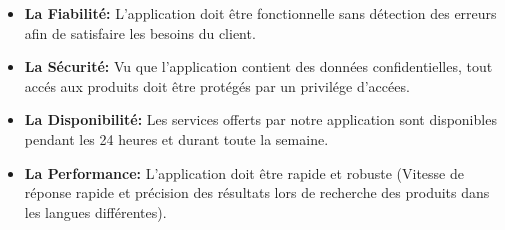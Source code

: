 \begin{itemize}
    \item \small\textbf{La Fiabilité: } L'application doit être fonctionnelle sans détection des erreurs afin de satisfaire les besoins du client.

    \item \small\textbf{La Sécurité: } Vu que l'application contient des données confidentielles, tout accés aux produits doit être protégés par un privilége d'accées.

     \item \small\textbf{La Disponibilité: } Les services offerts par notre application sont disponibles pendant les 24
     heures et durant toute la semaine.

     \item \small\textbf{La Performance: } L'application doit être rapide et robuste (Vitesse de réponse rapide et précision des résultats lors de recherche des produits dans les langues différentes).
\end{itemize}

\newpage